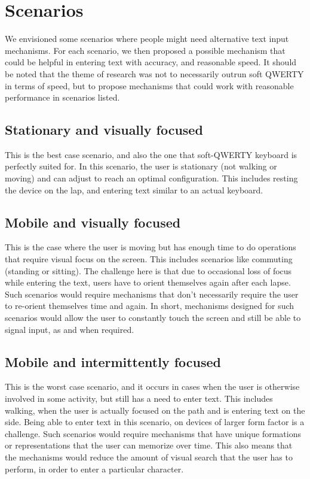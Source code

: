 \section{Scenarios}

We envisioned some scenarios where people might need alternative text
input mechanisms. For each scenario, we then proposed a possible
mechanism that could be helpful in entering text with accuracy, and
reasonable speed. It should be noted that the theme of research was
not to necessarily outrun soft QWERTY in terms of speed, but to
propose mechanisms that could work with reasonable performance in
scenarios listed.

\subsection{Stationary and visually focused}

This is the best case scenario, and also the one that soft-QWERTY
keyboard is perfectly suited for. In this scenario, the user is
stationary (not walking or moving) and can adjust to reach an optimal
configuration. This includes resting the device on the lap, and
entering text similar to an actual keyboard.

\subsection{Mobile and visually focused}

This is the case where the user is moving but has enough time to do
operations that require visual focus on the screen. This includes
scenarios like commuting (standing or sitting). The challenge here is
that due to occasional loss of focus while entering the text, users
have to orient themselves again after each lapse. Such scenarios would
require mechanisms that don't necessarily require the user to
re-orient themselves time and again. In short, mechanisms designed for
such scenarios would allow the user to constantly touch the screen and
still be able to signal input, as and when required.

\subsection{Mobile and intermittently focused}

This is the worst case scenario, and it occurs in cases when the user
is otherwise involved in some activity, but still has a need to enter
text. This includes walking, when the user is actually focused on the
path and is entering text on the side. Being able to enter text in
this scenario, on devices of larger form factor is a challenge. Such
scenarios would require mechanisms that have unique formations or
representations that the user can memorize over time. This also means
that the mechanisms would reduce the amount of visual search that the
user has to perform, in order to enter a particular character.
 
